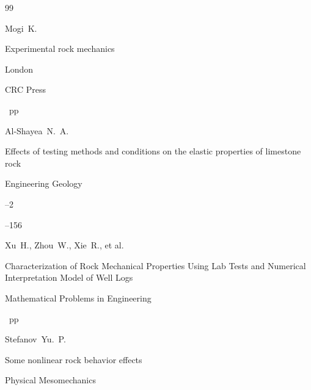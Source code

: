 \begin{thebibliography}{99}




\by Mogi~K.

\book Experimental rock mechanics


\publaddr London

\publ CRC Press 

~pp \nofrills





\by Al-Shayea~N.~A.

\paper Effects of testing methods and conditions on the elastic properties of limestone rock

\jour Engineering Geology



--2

--156






\by Xu~H., Zhou~W., Xie~R., et al.

\paper Characterization of Rock Mechanical Properties Using Lab Tests and Numerical Interpretation Model of Well Logs

\jour  Mathematical Problems in Engineering 





~pp \nofrills






\by Stefanov~Yu.~P.

\paper Some nonlinear rock behavior effects

\jour Physical Mesomechanics



\end{thebibliography}
